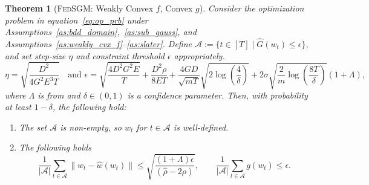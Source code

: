 \documentclass{article} %
\newtheorem{theorem}{Theorem}[]
\def\eqref#1{equation~\ref{#1}}
\def\A{{\mathcal A}}
\begin{document}
\begin{theorem}[\textsc{FedSGM}: Weakly Convex $f$, Convex $g$]
    \label{thm:fedsgm_partial_wc}
    Consider the optimization problem in \eqref{eq:op_prb} under Assumptions~\ref{as:bdd_domain},~\ref{as:sub_gauss}, and Assumptions~\ref{as:weakly_cvx_f}--\ref{as:slater}. Define $\A := \{t\in [T] \mid \hat{G}(w_{t})\leq \epsilon\},$ and 
    set step-size $\eta$ and constraint threshold $\epsilon$ appropriately.
    \[
        \eta = \sqrt{\frac{D^2}{4G^2 E^3 T}} 
        \quad \text{and }
        \epsilon = \sqrt{\frac{{4 D^2 G^2 E}}{{T}}} + \frac{D^2 \rho}{8 E T}
        + \frac{4GD}{\sqrt{mT}}\sqrt{2\log(\frac{4}{\delta})}
        + 2\sigma\sqrt{\frac{2}{m} \log\left(\frac{8T}{\delta}\right)}(1 + \Lambda),
    \]
     where $\Lambda$ is from  and $\delta \in (0,1)$ is a confidence parameter. Then, with probability at least $1 -\delta$, the following hold:
    \begin{enumerate}
    \item The set $\mathcal{A}$ is non-empty, so $w_t$ for $t \in \A$ is well-defined.
    \item The following holds
    \[
    \frac{1}{|\A|}\sum_{t \in \A}\|{w}_t - \hat{w}(w_t)\| \leq \sqrt{\frac{(1+\Lambda)\epsilon}{(\hat{\rho} - 2\rho)}}, 
    \qquad 
    \frac{1}{|\A|}\sum_{t \in \A} g(w_t) \leq \epsilon.
    \]
    \end{enumerate}
\end{theorem}
\end{document}
